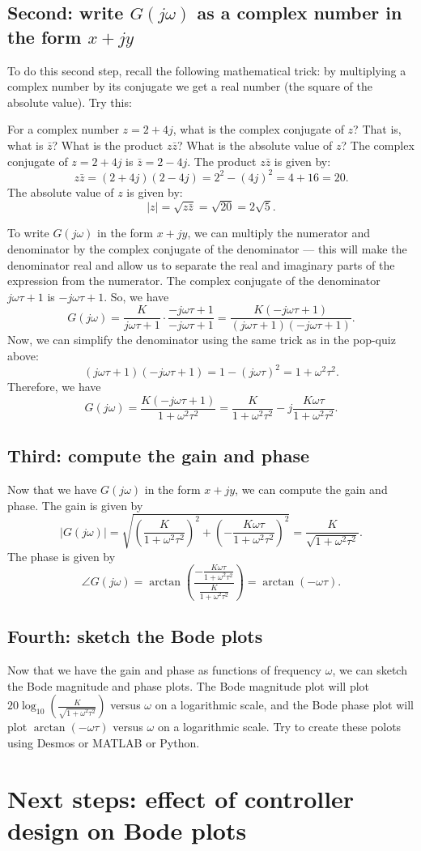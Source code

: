 \documentclass{ee122_notes}
\begin{document}
\subsection{Second: write $G(j\omega)$ as a complex number in the form $x + jy$}
To do this second step, recall the following mathematical trick: by multiplying a complex number by its conjugate we get a real number (the square of the absolute value). Try this:
\begin{popquiz}
For a complex number \(z = 2 + 4j\), what is the complex conjugate of \(z\)? That is, what is \(\bar{z}\)? What is the product \(z\bar{z}\)? What is the absolute value of \(z\)?
\popqsplit
The complex conjugate of \(z = 2 + 4j\) is \(\bar{z} = 2 - 4j\). The product \(z\bar{z}\) is given by:
\[
z\bar{z} = (2 + 4j)(2 - 4j) = 2^2 - (4j)^2 = 4 + 16 = 20.
\]
The absolute value of \(z\) is given by:
\[
|z| = \sqrt{z\bar{z}} = \sqrt{20} = 2\sqrt{5}.
\]
\end{popquiz}
To write \(G(j\omega)\) in the form \(x + jy\), we can multiply the numerator and denominator by the complex conjugate of the denominator --- this will make the denominator real and allow us to separate the real and imaginary parts of the expression from the numerator. The complex conjugate of the denominator \(j\omega\tau + 1\) is \(-j\omega\tau + 1\). So, we have
\[
G(j\omega) = \frac{K}{j\omega\tau + 1} \cdot \frac{-j\omega\tau + 1}{-j\omega\tau + 1} = \frac{K(-j\omega\tau + 1)}{(j\omega\tau + 1)(-j\omega\tau + 1)}.
\]
Now, we can simplify the denominator using the same trick as in the pop-quiz above:
\[
(j\omega\tau + 1)(-j\omega\tau + 1) = 1 - (j\omega\tau)^2 = 1 + \omega^2\tau^2.
\]
Therefore, we have
\[
G(j\omega) = \frac{K(-j\omega\tau + 1)}{1 + \omega^2\tau^2} = \frac{K}{1 + \omega^2\tau^2} - j\frac{K\omega\tau}{1 + \omega^2\tau^2}.
\]
\subsection{Third: compute the gain and phase}
Now that we have \(G(j\omega)\) in the form \(x + jy\), we can compute the gain and phase. The gain is given by
\[
|G(j\omega)| = \sqrt{\left(\frac{K}{1 + \omega^2\tau^2}\right)^2 + \left(-\frac{K\omega\tau}{1 + \omega^2\tau^2}\right)^2} = \frac{K}{\sqrt{1 + \omega^2\tau^2}}.
\]
The phase is given by
\[
\angle G(j\omega) = \arctan\left(\frac{-\frac{K\omega\tau}{1 + \omega^2\tau^2}}{\frac{K}{1 + \omega^2\tau^2}}\right) = \arctan(-\omega\tau).
\] 
\subsection{Fourth: sketch the Bode plots}
Now that we have the gain and phase as functions of frequency $\omega$, we can sketch the Bode magnitude and phase plots. The Bode magnitude plot will plot \(20\log_{10}\left(\frac{K}{\sqrt{1 + \omega^2\tau^2}}\right)\) versus \(\omega\) on a logarithmic scale, and the Bode phase plot will plot \(\arctan(-\omega\tau)\) versus \(\omega\) on a logarithmic scale. Try to create these polots using Desmos or MATLAB or Python.
\section{Next steps: effect of controller design on Bode plots}
\end{document}
